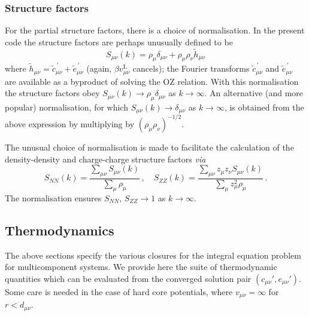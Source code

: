 \documentclass[12pt,a4paper]{article}
\newcommand{\latin}[1]{\emph{#1}}
\newcommand{\via}{\latin{via}}
\newcommand{\lr}{^{\mathrm{L}}}
\newcommand{\myprime}{^{{}\,\prime}}
\begin{document}
\subsubsection{Structure factors}
%
For the partial structure factors, there is a choice of normalisation.
In the present code the structure factors are perhaps unusually
defined to be
%
\begin{equation}
S_{\mu\nu}(k) = \rho_\mu\delta_{\mu\nu} + \rho_\mu\rho_\nu{\tilde
  h}_{\mu\nu}
\label{eq:skdef}
\end{equation}
%
where ${\tilde h}_{\mu\nu}={\tilde c}_{\mu\nu}\myprime + {\tilde
  e}_{\mu\nu}\myprime$ (again, $\beta v_{\mu\nu}\lr$ cancels); the
Fourier transforms ${\tilde c}_{\mu\nu}\myprime$ and ${\tilde
  e}_{\mu\nu}\myprime$ are available as a byproduct of solving the OZ
relation.  With this normalisation the structure factors obey
$S_{\mu\nu}(k)\to\rho_\mu\delta_{\mu\nu}$ as $k\to\infty$.  An
alternative (and more popular) normalisation, for which
$S_{\mu\nu}(k)\to\delta_{\mu\nu}$ as $k\to\infty$, is obtained from
the above expression by multiplying by $({\rho_\mu\rho_\nu})^{-1/2}$.

The unusual choice of normalisation is made to facilitate
the calculation of the density-density and charge-charge structure
factors \via\
%
\begin{equation}
  S_{NN}(k) = \frac{\sum_{\mu\nu}S_{\mu\nu}(k)}{\sum_\mu\rho_\mu}\,,\quad
  S_{ZZ}(k) = \frac{\sum_{\mu\nu}z_\mu z_\nu S_{\mu\nu}(k)}{\sum_\mu z_\mu^2\rho_\mu}\,.
  \label{eq:snnszz}
\end{equation}
%
The normalisation ensures $S_{NN}$, $S_{ZZ}\to1$ as $k\to\infty$.

\subsection{Thermodynamics}
\label{sec:thermo}
%
The above sections specify the various closures for the
integral equation problem for multicomponent systems.  We provide here
the suite of thermodynamic quantities which can be evaluated from the
converged solution pair $(c_{\mu\nu}', e_{\mu\nu}')$.  Some care is
needed in the case of hard core potentials, where $v_{\mu\nu}=\infty$
for $r<d_{\mu\nu}$.
\end{document}
